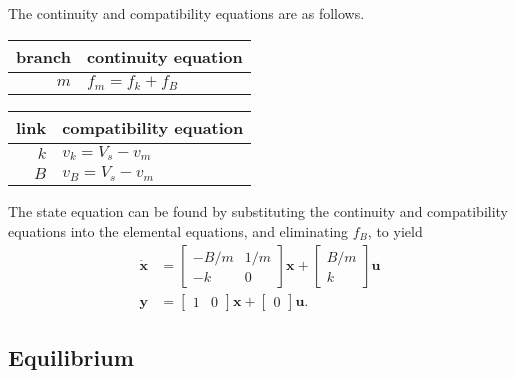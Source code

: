 \documentclass[dynamic_systems.tex]{subfiles}
\begin{document}
\endgroup

\vspace{.25\baselineskip}

\noindent The continuity and compatibility equations are as follows.\\
\begin{tabular}[t]{r|l}
branch & continuity equation \\ \hline
$m$ & $f_m = f_k + f_B$
\end{tabular}
\qquad
\begin{tabular}[t]{r|l}
link & compatibility equation \\ \hline
$k$ & $v_k = V_s - v_m$ \\
$B$ & $v_B = V_s - v_m$ 
\end{tabular}

\noindent 

\noindent The state equation can be found by substituting the continuity and compatibility equations into the elemental equations, and eliminating $f_B$, to yield
\tags{}
\begin{subequations}
\begin{align}
	\dot{\bm{x}} &= 
	\begin{bmatrix}
		-B/m & 1/m \\
		-k & 0
	\end{bmatrix}
	\bm{x} + 
	\begin{bmatrix}
		B/m \\ k
	\end{bmatrix}
	\bm{u} \\
	\bm{y} &= 
	\begin{bmatrix}
		1 & 0
	\end{bmatrix}
	\bm{x}
	+
	\begin{bmatrix} 
		0 
	\end{bmatrix}
	\bm{u}.
\end{align}
\end{subequations}

\subsection{Equilibrium}
\tags{}
\end{document}
